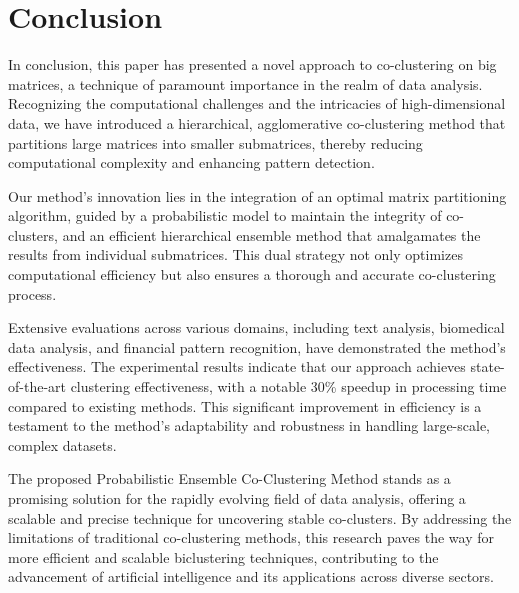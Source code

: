 
\section{Conclusion}
\label{sec:conclude}

In conclusion, this paper has presented a novel approach to co-clustering on big matrices, a technique of paramount importance in the realm of data analysis. Recognizing the computational challenges and the intricacies of high-dimensional data, we have introduced a hierarchical, agglomerative co-clustering method that partitions large matrices into smaller submatrices, thereby reducing computational complexity and enhancing pattern detection.

Our method's innovation lies in the integration of an optimal matrix partitioning algorithm, guided by a probabilistic model to maintain the integrity of co-clusters, and an efficient hierarchical ensemble method that amalgamates the results from individual submatrices. This dual strategy not only optimizes computational efficiency but also ensures a thorough and accurate co-clustering process.

Extensive evaluations across various domains, including text analysis, biomedical data analysis, and financial pattern recognition, have demonstrated the method's effectiveness. The experimental results indicate that our approach achieves state-of-the-art clustering effectiveness, with a notable 30\% speedup in processing time compared to existing methods. This significant improvement in efficiency is a testament to the method's adaptability and robustness in handling large-scale, complex datasets.

The proposed Probabilistic Ensemble Co-Clustering Method stands as a promising solution for the rapidly evolving field of data analysis, offering a scalable and precise technique for uncovering stable co-clusters. By addressing the limitations of traditional co-clustering methods, this research paves the way for more efficient and scalable biclustering techniques, contributing to the advancement of artificial intelligence and its applications across diverse sectors.

